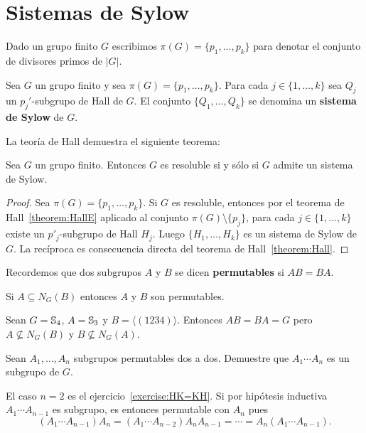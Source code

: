 
\chapter{Sistemas de Sylow}

Dado un grupo finito $G$ escribimos $\pi(G)=\{p_1,\dots,p_k\}$ para denotar el
conjunto de divisores primos de $|G|$. 

\begin{definition}
	Sea $G$ un grupo finito y sea $\pi(G)=\{p_1,\dots,p_k\}$. Para cada $j\in
	\{1,\dots,k\}$ sea $Q_j$ un $p_j'$-subgrupo de Hall de $G$. El conjunto
	$\{Q_1,\dots,Q_k\}$ se denomina un \textbf{sistema de Sylow} de $G$.
\end{definition}

La teoría de Hall demuestra el siguiente teorema:

\begin{theorem}
	Sea $G$ un grupo finito. Entonces $G$ es resoluble si y sólo si $G$ admite
	un sistema de Sylow.	
\end{theorem}

\begin{proof}
	Sea $\pi(G)=\{p_1,\dots,p_k\}$. Si $G$ es resoluble, entonces por el
	teorema de Hall~\ref{theorem:HallE} aplicado al conjunto
	$\pi(G)\setminus\{p_j\}$, para cada $j\in\{1,\dots,k\}$ existe un
	$p'_j$-subgrupo de Hall $H_j$. Luego $\{H_1,\dots,H_k\}$ es un sistema de
	Sylow de $G$. La recíproca es consecuencia directa del teorema de
	Hall~\ref{theorem:Hall}.
\end{proof}

Recordemos que dos subgrupos $A$ y $B$ se dicen
\textbf{permutables} si $AB=BA$.

\begin{example}
	Si $A\subseteq N_G(B)$ entonces $A$ y $B$ son permutables.
\end{example}

\begin{example}
	Sean $G=\mathbb{S}_4$, $A=\mathbb{S}_3$ y $B=\langle (1234)\rangle$. Entonces $AB=BA=G$
	pero $A\not\subseteq N_G(B)$ y $B\not\subseteq N_G(A)$.
\end{example}

\begin{exercise}
	Sean $A_1,\dots,A_n$ subgrupos permutables dos a dos. Demuestre que
	$A_1\cdots A_n$ es un subgrupo de $G$.
\end{exercise}

\begin{svgraybox}
	El caso $n=2$ es el ejercicio~\ref{exercise:HK=KH}. Si por hipótesis inductiva
	$A_1\cdots A_{n-1}$ es subgrupo, es entonces permutable con $A_n$ pues
	\[
	(A_1\cdots A_{n-1})A_n=(A_1\cdots A_{n-2})A_nA_{n-1}=\cdots=A_n(A_1\cdots A_{n-1}).
	\]
\end{svgraybox}

